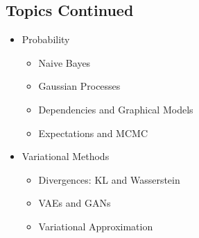 \begin{slide}
\section{Topics Continued}

\begin{PauseHighLight}
  \begin{itemize}
  \item Probability
    \begin{itemize}
    \item Naive Bayes\pause
    \item Gaussian Processes\pause
    \item Dependencies and Graphical Models\pause
    \item Expectations and MCMC\pause
    \end{itemize}
  \item Variational Methods
    \begin{itemize}
    \item Divergences: KL and Wasserstein\pause
    \item VAEs and GANs\pause
    \item Variational Approximation\pause
    \end{itemize}
  \end{itemize}
\end{PauseHighLight}

\end{slide}


